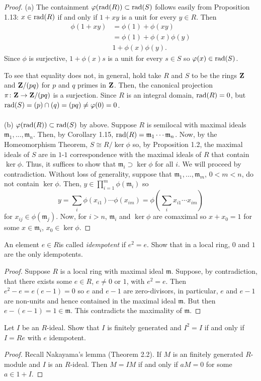 \begin{proof}
(a) The containment $\varphi(\mathrm{rad}(R))\subset\mathrm{rad}(S)$ follows easily
from Proposition 1.13: $x\in\mathrm{rad}(R)$ if and only if $1+xy$ is a
unit for every $y\in R$. Then
\begin{align*}
\phi(1+xy)&=\phi(1)+\phi(xy)\\
             &=\phi(1)+\phi(x)\phi(y)\\
             &1+\phi(x)\phi(y).
\end{align*}
Since $\phi$ is surjective, $1+\phi(x)s$ is a unit for every
$s\in S$ so $\varphi(x)\in\mathrm{rad}(S)$.

To see that equality does not, in general, hold take $R$ and $S$
to be the rings $\mathbf{Z}$ and $\mathbf{Z}/(pq)$ for $p$ and $q$ primes in
$\mathbf{Z}$. Then, the canonical projection $\pi\colon\mathbf{Z}\to\mathbf{Z}/(pq)$
is a surjection. Since $R$ is an integral domain,
$\mathrm{rad}(R)=0$, but $\mathrm{rad}(S)=(p)\cap (q)=(pq)\neq\varphi(0)=0$.
\\\\
(b) $\varphi(\mathrm{rad}(R))\subset\mathrm{rad}(S)$ by above. Suppose $R$ is
semilocal with maximal ideals
$\mathfrak{m}_1,...,\mathfrak{m}_n$. Then, by Corollary 1.15,
$\mathrm{rad}(R)=\mathfrak{m}_1\cdots\mathfrak{m}_n$. Now, by the
Homeomorphism Theorem, $S\cong R/\ker\phi$ so, by Proposition
1.2, the maximal ideals of $S$ are in $1$-$1$ correspondence with
the maximal ideals of $R$ that contain $\ker\phi$. Thus, it
suffices to show that $\mathfrak{m}_i\supset\ker\phi$ for all
$i$. We will proceed by contradiction. Without loss of
generality, suppose that $\mathfrak{m}_1,...,\mathfrak{m}_m$,
$0<m<n$, do not contain $\ker\phi$. Then,
$y\in\prod_{i=1}^m\phi(\mathfrak{m}_i)$ so
\[
y
=
\sum_i\phi(x_{i1})\cdots\phi(x_{im})
=
\phi\left(\sum_i x_{i1}\cdots x_{im}\right)
\]
for $x_{ij}\in\phi(\mathfrak{m}_j)$. Now, for $i>n$,
$\mathfrak{m}_i$ and $\ker\phi$ are comaximal so $x+x_0=1$ for
some $x\in\mathfrak{m}_i$, $x_0\in\ker\phi$.
\end{proof}
\newpage
\begin{problem}
An element $e\in R$is called \emph{idempotent} if $e^2=e$. Show
that in a local ring, $0$ and $1$ are the only idempotents.
\end{problem}
\begin{proof}
Suppose $R$ is a local ring with maximal ideal
$\mathfrak{m}$. Suppose, by contradiction, that there exists some
$e\in R$, $e\neq 0$ or $1$, with $e^2=e$. Then $e^2-e=e(e-1)=0$
so $e$ and $e-1$ are zero-divisors, in particular, $e$ and $e-1$
are non-units and hence contained in the maximal ideal
$\mathfrak{m}$. But then $e-(e-1)=1\in\mathfrak{m}$. This
contradicts the maximality of $\mathfrak{m}$.
\end{proof}
\newpage
\begin{problem}
Let $I$ be an $R$-ideal. Show that $I$ is finitely generated and
$I^2=I$ if and only if $I=Re$ with $e$ idempotent.
\end{problem}
\begin{proof}
Recall Nakayama's lemma (Theorem 2.2). If $M$ is an finitely
generated $R$-module and $I$ is an $R$-ideal. Then $M=IM$ if and
only if $aM=0$ for some $a\in 1+I$.
\end{proof}

